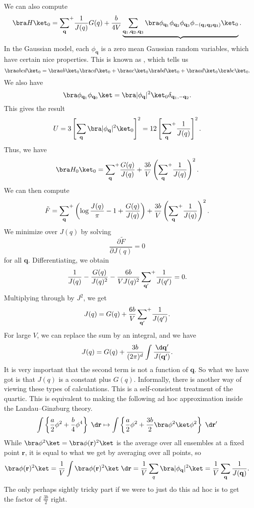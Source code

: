 \documentclass[a4paper]{article}
\newcommand\splus{\!{\vphantom{\prod}}^+}
\begin{document}
We can also compute
\[
  \bra H\ket_0 = \sum_\mathbf{q} \splus \frac{1}{J(q)} G(q) + \frac{b}{4V} \underbrace{\sum_{\mathbf{q}_1, \mathbf{q}_2, \mathbf{q}_3}\bra \phi_{\mathbf{q}_1} \phi_{\mathbf{q}_2} \phi_{\mathbf{q}_3} \phi_{-(\mathbf{q}_1 \mathbf{q}_2 \mathbf{q}_3)}\ket_0}.
\]
In the Gaussian model, each $\phi_\mathbf{q}$ is a zero mean Gaussian random variables, which have certain nice properties. This is known as , which tells us
\[
  \bra abcd \ket_0 = \bra ab\ket_0 \bra cd\ket_0 + \bra ac\ket_0 \bra bd\ket_0 + \bra ad\ket_0 \bra bc\ket_0.
\]
We also have
\[
  \bra \phi_{\mathbf{q}_1} \phi_{\mathbf{q}_0}\ket = \bra |\phi_\mathbf{q}|^2 \ket_0 \delta_{\mathbf{q}_1, - \mathbf{q}_2}.
\]
This gives the result
\[
  U = 3 \left[\sum_\mathbf{q} \bra |\phi_\mathbf{q}|^2\ket_0\right]^2 = 12 \left[\sum_\mathbf{q} \splus \frac{1}{J(q)}\right]^2.
\]
Thus, we have
\[
  \bra H_0\ket_0 = \sum_{\mathbf{q}} \splus \frac{G(q)}{J(q)} + \frac{3b}{V} \left(\sum_\mathbf{q} \splus \frac{1}{J(q)}\right)^2.
\]
We can then compute
\[
  \tilde{F} = \sum_{\mathbf{q}} \splus \left(\log \frac{J(q)}{\pi} - 1 + \frac{G(q)}{J(q)}\right) + \frac{3b}{V}\left(\sum_\mathbf{q} \splus \frac{1}{J(q)}\right)^2.
\]
We minimize over $J(q)$ by solving
\[
  \frac{\partial \tilde{F}}{\partial J(q)} = 0
\]
for all $\mathbf{q}$. Differentiating, we obtain
\[
  \frac{1}{J(q)} - \frac{G(q)}{J(q)^2} - \frac{6b}{V J(q)^2} \sum_{\mathbf{q}'} \splus \frac{1}{J(q')} = 0.
\]
Multiplying through by $J^2$, we get
\[
  J(q) = G(q) + \frac{6b}{V} \sum_{\mathbf{q}'} \splus \frac{1}{J(q')}.
\]
For large $V$, we can replace the sum by an integral, and we have
\[
  J(q) = G(q) + \frac{3b}{(2\pi)^d} \int \frac{\d \mathbf{q}'}{J(\mathbf{q}')}.
\]
It is very important that the second term is not a function of $\mathbf{q}$. So what we have got is that $J(q)$ is a constant plus $G(q)$. Informally, there is another way of viewing these types of calculations. This is a self-consistent treatment of the quartic. This is equivalent to making the following ad hoc approximation inside the Landau--Ginzburg theory.
\[
  \int \left\{ \frac{a}{2} \phi^2 + \frac{b}{4} \phi^4\right\} \;\d \mathbf{r} \mapsto \int \left\{ \frac{a}{2} \phi^2 + \frac{3b}{2} \bra \phi^2 \ket \phi^2\right\}\;\d \mathbf{r}'
\]
While $\bra \phi^2\ket = \bra \phi(\mathbf{r})^2\ket$ is the average over all ensembles at a fixed point $\mathbf{r}$, it is equal to what we get by averaging over all points, so
\[
  \bra \phi(\mathbf{r})^2\ket = \frac{1}{V} \int \bra \phi(\mathbf{r})^2\ket \;\d \mathbf{r} = \frac{1}{V} \sum_q \bra |\phi_\mathbf{q}|^2 \ket = \frac{1}{V} \sum_{\mathbf{q}} \frac{1}{J(\mathbf{q})}.
\]
The only perhaps sightly tricky part if we were to just do this ad hoc is to get the factor of $\frac{3b}{2}$ right.
\end{document}
